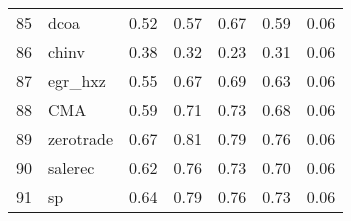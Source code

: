 \documentclass[12pt]{article}
\begin{document}
\begin{footnotesize}
\begin{longtable}{rl|c|c|c|c|c}
85  & dcoa             & 0.52                                                                                      & 0.57                                                                                        & 0.67                                                                                         & 0.59 & 0.06               \\
86  & chinv            & 0.38                                                                                      & 0.32                                                                                        & 0.23                                                                                         & 0.31 & 0.06               \\
87  & egr\_hxz         & 0.55                                                                                      & 0.67                                                                                        & 0.69                                                                                         & 0.63 & 0.06               \\
88  & CMA              & 0.59                                                                                      & 0.71                                                                                        & 0.73                                                                                         & 0.68 & 0.06               \\
89  & zerotrade        & 0.67                                                                                      & 0.81                                                                                        & 0.79                                                                                         & 0.76 & 0.06               \\
90  & salerec          & 0.62                                                                                      & 0.76                                                                                        & 0.73                                                                                         & 0.70 & 0.06               \\
91  & sp               & 0.64                                                                                      & 0.79                                                                                        & 0.76                                                                                         & 0.73 & 0.06               \\

\end{longtable}
\end{footnotesize}
\end{document}
